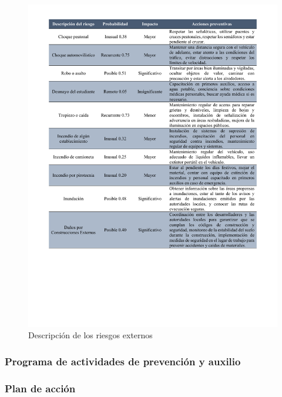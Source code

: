     \begin{figure}[H] 
        \centering
        \includegraphics[trim = {15mm 60mm 15mm 10mm},clip,scale=0.41]{22/Img/riesgosExternos.pdf}
        \caption{Descripción de los riesgos externos}
        \label{fig:ideEx}
    \end{figure}
    \subsubsection{Programa de actividades de prevención y auxilio}
    
    
    \subsubsection{Plan de acción}
    
